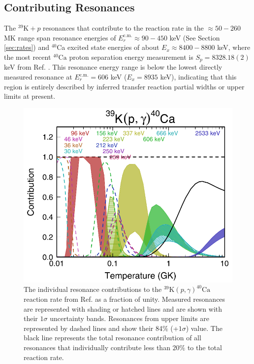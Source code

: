 \subsection{Contributing Resonances}

The $^{39}\mathrm{K}+p$ resonances that contribute to the reaction rate in the $\approx50-260$ MK range span resonance energies of $E^{\mathrm{c.m.}}_{r} \approx 90-450$ keV (See Section \ref{sec:rates}) and $^{40}$Ca excited state energies of about $E_{x} \approx 8400-8800$ keV, where the most recent $^{40}\mathrm{Ca}$ proton separation energy measurement is $S_{p} = 8328.18(2)$ keV from Ref. \cite{Wang2021}. This resonance energy range is below the lowest directly measured resonance at $E^{\mathrm{c.m.}}_{r} = 606$ keV ($E_{x} = 8935$ keV), indicating that this region is entirely described by inferred transfer reaction partial widths or upper limits at present.

\begin{figure}[!p]
\centering
\includegraphics[width=6in]{Chapter-6/figs/Contrib_Longland2018.png}
\caption{\label{fig:contrib_longland2018}The individual resonance contributions to the $^{39}\mathrm{K}(p,\gamma)^{40}\mathrm{Ca}$ reaction rate from Ref. \cite{Longland2018} as a fraction of unity. Measured resonances are represented with shading or hatched lines and are shown with their $1\sigma$ uncertainty bands. Resonances from upper limits are represented by dashed lines and show their 84$\%$ (+$1\sigma$) value. The black line represents the total resonance contribution of all resonances that individually contribute less than $20\%$ to the total reaction rate.}
\end{figure}

